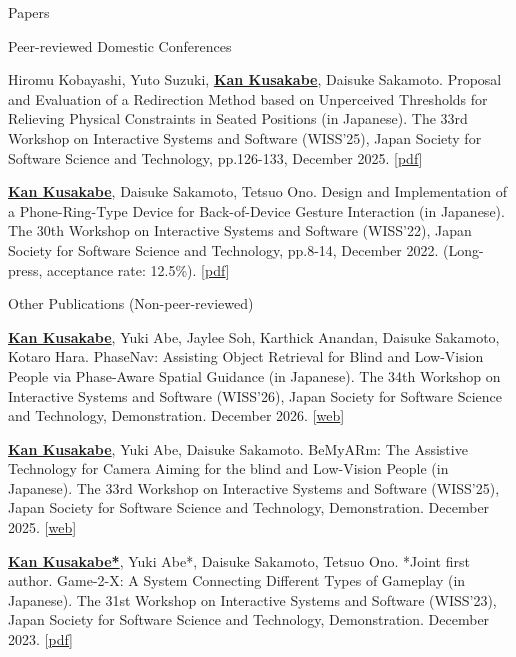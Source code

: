 \documentclass[
	11pt, %
]{resume} %
\begin{document}
\begin{rSection}{Papers}
\begin{rSubsection}{Peer-reviewed Domestic Conferences}{}{}{}
		\item Hiromu Kobayashi, Yuto Suzuki, \underline{\textbf{Kan Kusakabe}}, Daisuke Sakamoto. Proposal and Evaluation of a Redirection Method based on Unperceived Thresholds for Relieving Physical Constraints in Seated Positions (in Japanese). The 33rd Workshop on Interactive Systems and Software (WISS'25), Japan Society for Software Science and Technology, pp.126-133, December 2025. [\href{https://www.wiss.org/WISS2025/downloads/proceedings.pdf}{pdf}] 
        
		\item \underline{\textbf{Kan Kusakabe}}, Daisuke Sakamoto, Tetsuo Ono. Design and Implementation of a Phone-Ring-Type Device for Back-of-Device Gesture Interaction (in Japanese). The 30th Workshop on Interactive Systems and Software (WISS'22), Japan Society for Software Science and Technology, pp.8-14, December 2022. (Long-press, acceptance rate: 12.5\%). [\href{https://www.wiss.org/WISS2022Proceedings/data/02.pdf}{pdf}]
        
	\end{rSubsection}
    
	\begin{rSubsection}{Other Publications (Non-peer-reviewed)}{}{}{}
		\item \underline{\textbf{Kan Kusakabe}}, Yuki Abe, Jaylee Soh, Karthick Anandan, Daisuke Sakamoto, Kotaro Hara. PhaseNav: Assisting Object Retrieval for Blind and Low-Vision People via Phase-Aware Spatial Guidance (in Japanese). The 34th Workshop on Interactive Systems and Software (WISS'26), Japan Society for Software Science and Technology, Demonstration. December 2026. [\href{https://www.wiss.org/WISS2026/demo.html}{web}]

		\item \underline{\textbf{Kan Kusakabe}}, Yuki Abe, Daisuke Sakamoto. BeMyARm: The Assistive Technology for Camera Aiming for the blind and Low-Vision People (in Japanese). The 33rd Workshop on Interactive Systems and Software (WISS'25), Japan Society for Software Science and Technology, Demonstration. December 2025. [\href{https://www.wiss.org/WISS2025/demo.html}{web}]
		\item \underline{\textbf{Kan Kusakabe*}}, Yuki Abe*, Daisuke Sakamoto, Tetsuo Ono. *Joint first author. Game-2-X: A System Connecting Different Types of Gameplay (in Japanese). The 31st Workshop on Interactive Systems and Software (WISS'23), Japan Society for Software Science and Technology, Demonstration. December 2023. [\href{https://www.wiss.org/WISS2023Proceedings/data/1-A03.pdf}{pdf}]
        

\end{rSubsection}
\end{rSection}
\end{document}
